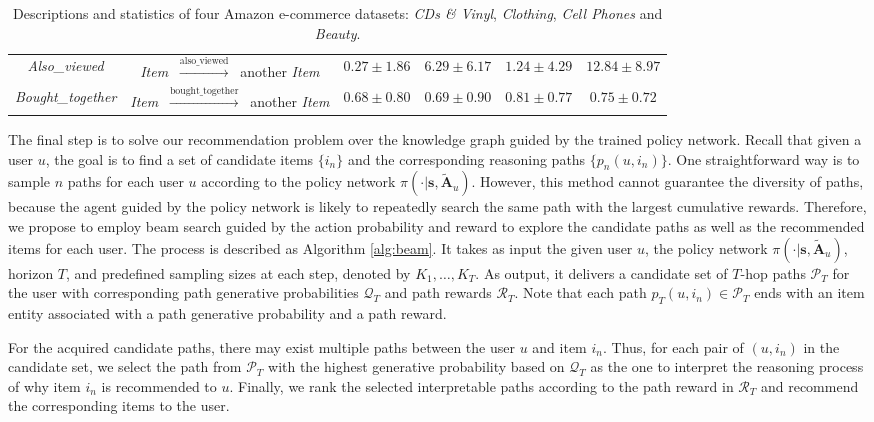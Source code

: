 \documentclass[sigconf]{acmart}
\begin{document}
\begin{table}[t]
\begin{tabular}{cccccc}
\emph{Also\_viewed}  & \emph{Item} $~\xrightarrow{\text{also\_viewed}}~$ another \emph{Item} & $0.27\pm1.86$ & $6.29\pm6.17$ & $1.24\pm4.29$ & $12.84\pm8.97$ \\
\emph{Bought\_together} & \emph{Item} $~\xrightarrow{\text{bought\_together}}~$ another \emph{Item} & $0.68\pm0.80$ & $0.69\pm0.90$ & $0.81\pm0.77$ & $0.75\pm0.72$ \\
\hline
\end{tabular}
\caption{Descriptions and statistics of four Amazon e-commerce datasets: \emph{CDs \& Vinyl}, \emph{Clothing}, \emph{Cell Phones} and \emph{Beauty}.}
\label{tab:stats}
\vspace{-25pt}
\end{table}

The final step is to solve our recommendation problem over the knowledge graph guided by the trained policy network.
Recall that given a user $u$, the goal is to find a set of candidate items $\{i_n\}$ and the corresponding reasoning paths $\{p_n(u, i_n)\}$.
One straightforward way is to sample $n$ paths for each user $u$ according to the policy network $\pi(\cdot|\mathbf{s},\mathbf{\tilde{A}}_u)$.
However, this method cannot guarantee the diversity of paths, because the agent guided by the policy network is likely to repeatedly search the same path with the largest cumulative rewards.
Therefore, we propose to employ beam search guided by the action probability and reward to explore the candidate paths as well as the recommended items for each user.
The process is described as Algorithm \ref{alg:beam}. 
It takes as input the given user $u$, the policy network $\pi(\cdot|\mathbf{s},\mathbf{\tilde{A}}_u)$, horizon $T$, and predefined sampling sizes at each step, denoted by $K_1,\ldots,K_T$.
As output, it delivers a candidate set of $T$-hop paths $\mathcal{P}_T$ for the user with corresponding path generative probabilities $\mathcal{Q}_T$ and path rewards $\mathcal{R}_T$.
Note that each path $p_T(u,i_n)\in\mathcal{P}_T$ ends with an item entity associated with a path generative probability and a path reward.

For the acquired candidate paths, there may exist multiple paths between the user $u$ and item $i_n$.
Thus, for each pair of $(u,i_n)$ in the candidate set, we select the path from $\mathcal{P}_T$ with the highest generative probability based on $\mathcal{Q}_T$
as the one to interpret the reasoning process of why item $i_n$ is recommended to $u$.
Finally, we rank the selected interpretable paths according to the path reward in $\mathcal{R}_T$ and recommend the corresponding items to the user. 
\end{document}
